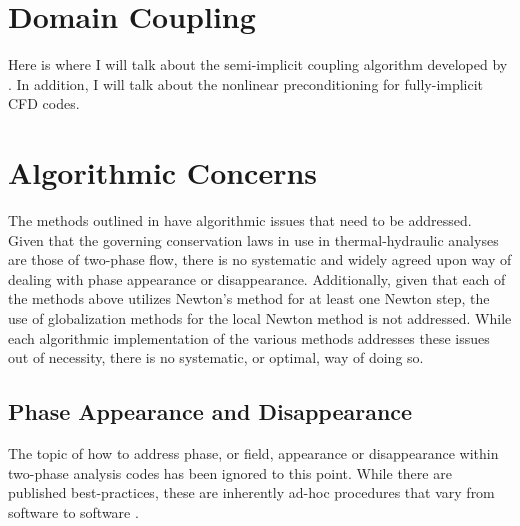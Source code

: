 \section{Domain Coupling}
\label{sect:code_coupling}
Here is where I will talk about the semi-implicit coupling algorithm developed by \citet{Weaver2002}.
In addition, I will talk about the nonlinear preconditioning for fully-implicit CFD codes.
\section{Algorithmic Concerns}
\label{sect:algorithmic_concerns}
The methods outlined in  have algorithmic issues that need to be addressed.
Given that the governing conservation laws in use in thermal-hydraulic analyses are those of two-phase flow, there is no systematic and widely agreed upon way of dealing with phase appearance or disappearance.
Additionally, given that each of the methods above utilizes Newton's method for at least one Newton step, the use of globalization methods for the local Newton method is not addressed.
While each algorithmic implementation of the various methods addresses these issues out of necessity, there is no systematic, or optimal, way of doing so. 

\subsection{Phase Appearance and Disappearance}
\label{subsect:phase_change}
The topic of how to address phase, or field, appearance or disappearance within two-phase analysis codes has been ignored to this point.
While there are published best-practices, these are inherently ad-hoc procedures that vary from software to software \cite{Bestion2000}.

